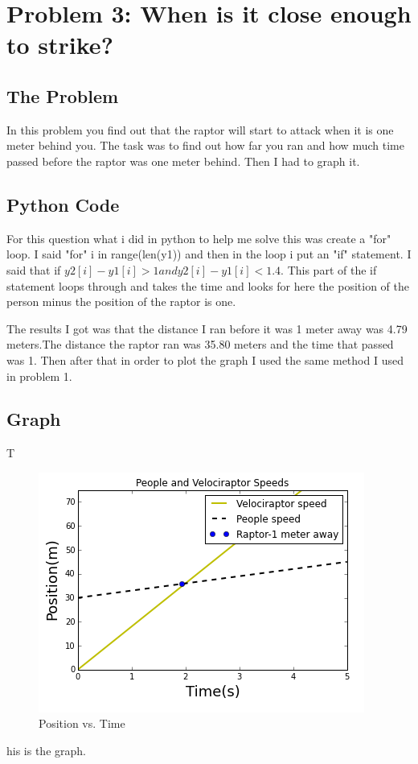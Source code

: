 \documentclass[twocolumn]{revtex4}
\begin{document}
\section{Problem 3: When is it close enough to strike?}

\subsection{The Problem}
In this problem you find out that the raptor will start to attack when it is one meter behind you. The task was to find out how far you ran and how much time passed before the raptor was one meter behind. Then I had to graph it.

\subsection{Python Code}
For this question what i did in python to help me solve this was create a "for" loop. I said "for" i in range(len(y1)) and then in the loop i put an "if" statement. I said that if $y2[i]-y1[i]>1 and y2[i]-y1[i]<1.4$. This part of the if statement loops through and takes the time and looks for here the position of the person minus the position of the raptor is one.

The results I got was that the distance I ran before it was 1 meter away was 4.79 meters.The distance the raptor ran was 35.80 meters and the time that passed was 1.
Then after that in order to plot the graph I used the same method I used in problem 1.

\subsection{Graph}
T\begin{figure}[h!]
\caption{Position vs. Time}
\centering
\includegraphics[width=.5\textwidth]{PvT_graph2.PNG}
\end{figure}his is the graph.

\end{document}
